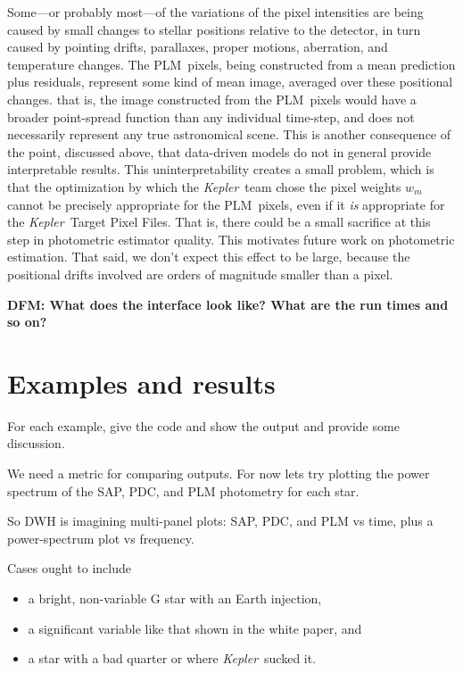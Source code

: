 \documentclass[12pt, preprint]{aastex}
\newcommand{\project}[1]{\textsl{#1}}
\newcommand{\Kepler}{\project{Kepler}}
\newcommand{\name}{PLM}
\newcommand{\todo}[1]{\textbf{#1}}
\begin{document}
Some---or probably most---of the variations of the pixel intensities
  are being caused by small changes to stellar positions relative to the detector,
  in turn caused by pointing drifts, parallaxes, proper motions, aberration, and temperature changes.
The \name\ pixels, being constructed from a mean prediction plus residuals,
  represent some kind of mean image, averaged over these positional changes.
  that is, the image constructed from the \name\ pixels would have a broader
  point-spread function than any individual time-step,
  and does not necessarily represent any true astronomical scene.
This is another consequence of the point, discussed above,
  that data-driven models do not in general provide interpretable results.
This uninterpretability creates a small problem,
  which is that the optimization by which the \Kepler\ team chose the pixel weights $w_m$
  cannot be precisely appropriate for the \name\ pixels,
  even if it \emph{is} appropriate for the \Kepler\ Target Pixel Files.
That is, there could be a small sacrifice at this step in photometric estimator quality.
This motivates future work on photometric estimation.
That said, we don't expect this effect to be large,
  because the positional drifts involved are orders of magnitude smaller than a pixel.

\todo{DFM: What does the interface look like?  What are the run times and so on?}

\section{Examples and results}

For each example, give the code and show the output and provide some discussion.

We need a metric for comparing outputs.
For now lets try plotting the power spectrum of the SAP, PDC, and PLM photometry for each star.

So DWH is imagining multi-panel plots: SAP, PDC, and PLM vs time,
  plus a power-spectrum plot vs frequency.

Cases ought to include
\begin{itemize}
\item a bright, non-variable G star with an Earth injection,
\item a significant variable like that shown in the white paper, and
\item a star with a bad quarter or where \Kepler\ sucked it.
\end{itemize}
\end{document}
